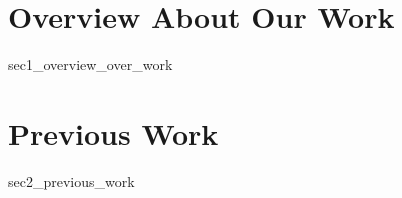 \section{Overview About Our Work}
{sec1_overview_over_work}

\section{Previous Work}
{sec2_previous_work}